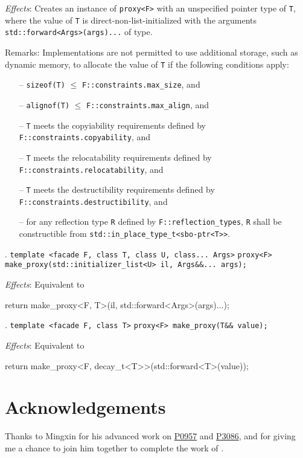 \documentclass[10pt, a4paper, oneside]{article}
\begin{document}
\textit{Effects}: Creates an instance of \verb|proxy<F>| with an unspecified pointer type of \verb|T|,
where the value of \verb|T| is direct-non-list-initialized with the arguments \verb|std::forward<Args>(args)...| of type.

Remarks: Implementations are not permitted to use additional storage, such as dynamic memory, to
allocate the value of \verb|T| if the following conditions apply:
\begin{itemize}
  \item[--] \verb|sizeof(T)| $\le$ \verb|F::constraints.max_size|, and
  \item[--] \verb|alignof(T)| $\le$ \verb|F::constraints.max_align|, and
  \item[--] \verb|T| meets the copyiability requirements defined by \verb|F::constraints.copyability|, and
  \item[--] \verb|T| meets the relocatability requirements defined by \verb|F::constraints.relocatability|, and
  \item[--] \verb|T| meets the destructibility requirements defined by \verb|F::constraints.destructibility|, and
  \item[--] for any reflection type \verb|R| defined by \verb|F::reflection_types|,\smallbreak
  \verb|R| shall be constructible from \verb|std::in_place_type_t<sbo-ptr<T>>|.
\end{itemize}

. \verb|template <facade F, class T, class U, class... Args>|\smallbreak
\indent \verb|proxy<F> make_proxy(std::initializer_list<U> il, Args&&... args);|

\textit{Effects}: Equivalent to
\begin{codeblock}
  return make_proxy<F, T>(il, std::forward<Args>(args)...);
\end{codeblock}

. \verb|template <facade F, class T>|\smallbreak
\indent \verb|proxy<F> make_proxy(T&& value);|

\textit{Effects}: Equivalent to
\begin{codeblock}
  return make_proxy<F, decay_t<T>>(std::forward<T>(value));
\end{codeblock}

\section{Acknowledgements}
Thanks to Mingxin for his advanced work on \href{https://wg21.link/p0957}{P0957} and \href{https://wg21.link/p3086}{P3086},
and for giving me a chance to join him together to complete the work of .
\end{document}
